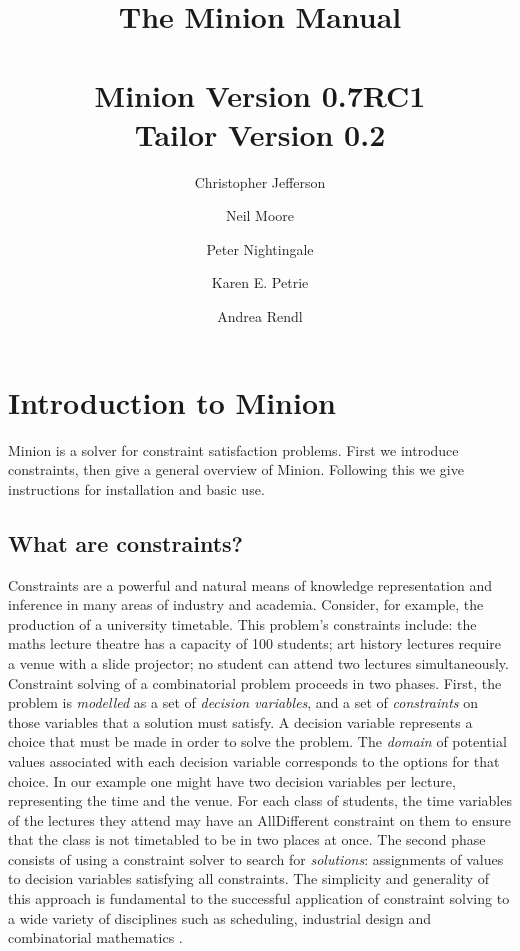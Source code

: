 \documentclass[oneside]{book}
\begin{document}
\title{{\bf The Minion Manual}\\
~\\
Minion Version 0.7RC1\\
Tailor Version 0.2}
\author{Christopher Jefferson \and Neil Moore \and Peter Nightingale \and Karen E. Petrie \and Andrea Rendl }

\maketitle
\tableofcontents

\chapter{Introduction to Minion}

Minion is a solver for constraint satisfaction problems. First we
introduce constraints, then give a general overview of Minion. Following
this we give instructions for installation and basic use.


\section{What are constraints?}

Constraints are a powerful and natural means of knowledge representation
and inference in many areas of industry and academia. Consider, for
example, the production of a university timetable. This problem's
constraints include: the maths lecture theatre has a capacity of 100
students; art history lectures require a venue with a slide projector;
no student can attend two lectures simultaneously. Constraint solving
of a combinatorial problem proceeds in two phases. First, the problem
is \emph{modelled} as a set of \emph{decision variables}, and a set
of \emph{constraints} on those variables that a solution must satisfy.
A decision variable represents a choice that must be made in order
to solve the problem. The \emph{domain} of potential values associated
with each decision variable corresponds to the options for that choice.
In our example one might have two decision variables per lecture,
representing the time and the venue. For each class of students, the
time variables of the lectures they attend may have an AllDifferent
constraint on them to ensure that the class is not timetabled to be
in two places at once. The second phase consists of using a constraint
solver to search for \emph{solutions}: assignments of values to decision
variables satisfying all constraints. The simplicity and generality
of this approach is fundamental to the successful application of constraint
solving to a wide variety of disciplines such as scheduling, industrial
design and combinatorial mathematics \cite{wallace:Survey}.
\end{document}
